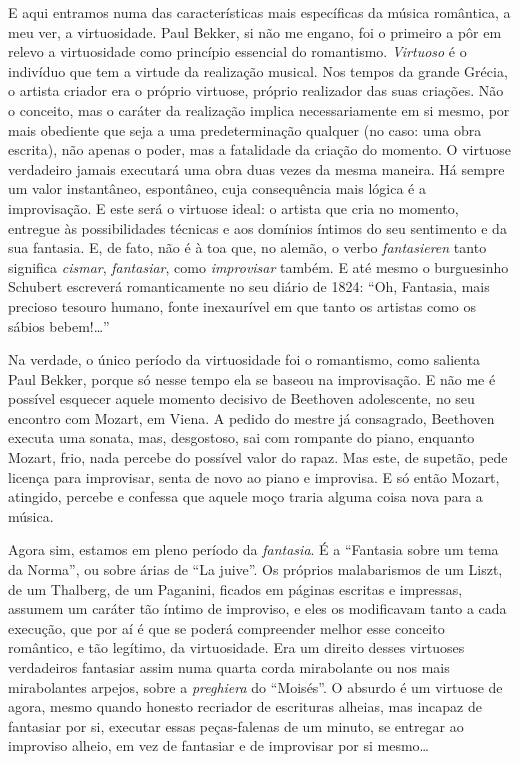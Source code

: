 E aqui entramos numa das características mais específicas da música
romântica, a meu ver, a virtuosidade. Paul Bekker, si não me engano, foi
o primeiro a pôr em relevo a virtuosidade como princípio essencial do
romantismo. \textit{Virtuoso} é o indivíduo que tem a virtude da realização
musical. Nos tempos da grande Grécia, o artista criador era o próprio
virtuose, próprio realizador das suas criações. Não o conceito, mas o
caráter da realização implica necessariamente em si mesmo, por mais
obediente que seja a uma predeterminação qualquer (no caso: uma obra
escrita), não apenas o poder, mas a fatalidade da criação do momento. O
virtuose verdadeiro jamais executará uma obra duas vezes da mesma
maneira. Há sempre um valor instantâneo, espontâneo, cuja consequência
mais lógica é a improvisação. E este será o virtuose ideal: o artista
que cria no momento, entregue às possibilidades técnicas e aos domínios
íntimos do seu sentimento e da sua fantasia. E, de fato, não é à toa
que, no alemão, o verbo \textit{fantasieren} tanto significa \textit{cismar},
\textit{fantasiar}, como \textit{improvisar} também. E até mesmo o burguesinho
Schubert escreverá romanticamente no seu diário de 1824: ``Oh, Fantasia,
mais precioso tesouro humano, fonte inexaurível em que tanto os artistas
como os sábios bebem!\ldots{}''

Na verdade, o único período da virtuosidade foi o romantismo, como
salienta Paul Bekker, porque só nesse tempo ela se baseou na
improvisação. E não me é possível esquecer aquele momento decisivo de
Beethoven adolescente, no seu encontro com Mozart, em Viena. A pedido do
mestre já consagrado, Beethoven executa uma sonata, mas, desgostoso, sai
com rompante do piano, enquanto Mozart, frio, nada percebe do possível
valor do rapaz. Mas este, de supetão, pede licença para improvisar,
senta de novo ao piano e improvisa. E só então Mozart, atingido, percebe
e confessa que aquele moço traria alguma coisa nova para a música.

Agora sim, estamos em pleno período da \textit{fantasia}. É a ``Fantasia
sobre um tema da Norma'', ou sobre árias de ``La juive''. Os próprios
malabarismos de um Liszt, de um Thalberg, de um Paganini, ficados em
páginas escritas e impressas, assumem um caráter tão íntimo de
improviso, e eles os modificavam tanto a cada execução, que por aí é que
se poderá compreender melhor esse conceito romântico, e tão legítimo, da
virtuosidade. Era um direito desses virtuoses verdadeiros fantasiar
assim numa quarta corda mirabolante ou nos mais mirabolantes arpejos,
sobre a \textit{preghiera} do ``Moisés''. O absurdo é um virtuose de agora, mesmo
quando honesto recriador de escrituras alheias, mas incapaz de
fantasiar por si, executar essas peças-falenas de um minuto, se entregar
ao improviso alheio, em vez de fantasiar e de improvisar por si mesmo\ldots{}

